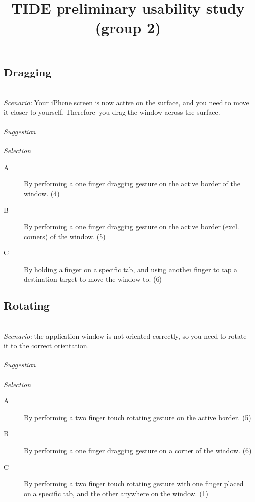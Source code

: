 \documentclass[11pt]{amsart}
\title{TIDE preliminary usability study (group 2)}
\begin{document}
\maketitle





\subsection{Dragging}
\hfill\\
\emph{Scenario:}
Your iPhone screen is now active on the surface, and you need to move it closer to yourself. Therefore, you drag the window across the surface.
\\\\
\emph{Suggestion}
\\\\
\emph{Selection}
\begin{description}
\item[A]{By performing a one finger dragging gesture on the active border of the window. (4)}
\item[B]{By performing a one finger dragging gesture on the active border (excl. corners) of the window. (5)}
\item[C]{By holding a finger on a specific tab, and using another finger to tap a destination target to move the window to. (6)}
\end{description}


\subsection{Rotating}
\hfill\\
\emph{Scenario:}
the application window is not oriented correctly, so you need to rotate it to the correct orientation. 
\\\\
\emph{Suggestion}
\\\\
\emph{Selection}
\begin{description}
\item[A]{By performing a two finger touch rotating gesture on the active border. (5)}
\item[B]{By performing a one finger dragging gesture on a corner of the window. (6)}
\item[C]{By performing a two finger touch rotating gesture with one finger placed on a specific tab, and the other anywhere on the window. (1)}
\end{description}
\end{document}
